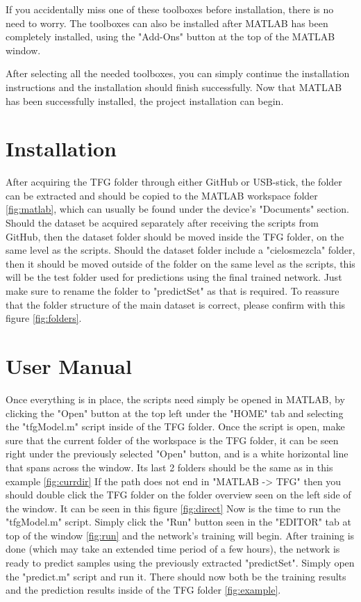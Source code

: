 
If you accidentally miss one of these toolboxes before installation, there is no need to worry. The toolboxes can also be installed after MATLAB has been completely installed, using the "Add-Ons" button at the top of the MATLAB window.

After selecting all the needed toolboxes, you can simply continue the installation instructions and the installation should finish successfully. Now that MATLAB has been successfully installed, the project installation can begin.
\section{Installation}
After acquiring the TFG folder through either GitHub or USB-stick, the folder can be extracted and should be copied to the MATLAB workspace folder \ref{fig:matlab}, which can usually be found under the device's "Documents" section.
Should the dataset be acquired separately after receiving the scripts from GitHub, then the dataset folder should be moved inside the TFG folder, on the same level as the scripts. Should the dataset folder include a "cielosmezcla" folder, then it should be moved outside of the folder on the same level as the scripts, this will be the test folder used for predictions using the final trained network. Just make sure to rename the folder to "predictSet" as that is required. To reassure that the folder structure of the main dataset is correct, please confirm with this figure \ref{fig:folders}.

\section{User Manual}
Once everything is in place, the scripts need simply be opened in MATLAB, by clicking the "Open" button at the top left under the "HOME" tab and selecting the "tfgModel.m" script inside of the TFG folder. Once the script is open, make sure that the current folder of the workspace is the TFG folder, it can be seen right under the previously selected "Open" button, and is a white horizontal line that spans across the window. Its last 2 folders should be the same as in this example \ref{fig:currdir}
If the path does not end in "MATLAB -> TFG" then you should double click the TFG folder on the folder overview seen on the left side of the window. It can be seen in this figure \ref{fig:direct}
Now is the time to run the "tfgModel.m" script. Simply click the "Run" button seen in the "EDITOR" tab at top of the window \ref{fig:run} and the network's training will begin. After training is done (which may take an extended time period of a few hours), the network is ready to predict samples using the previously extracted "predictSet". Simply open the "predict.m" script and run it. There should now both be the training results and the prediction results inside of the TFG folder \ref{fig:example}.